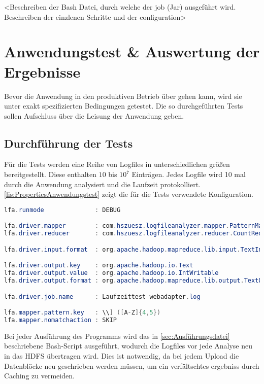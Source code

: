 <Beschreiben der Bash Datei, durch welche der job (Jar) ausgeführt wird. Beschreiben der einzlenen Schritte und der configuration>

\section{Anwendungstest \& Auswertung der Ergebnisse}
Bevor die Anwendung in den produktiven Betrieb über gehen kann, wird sie unter exakt spezifizierten Bedingungen getestet. Die so durchgeführten Tests sollen Aufschluss über die Leisung der Anwendung geben.

\subsection{Durchführung der Tests}
Für die Tests werden eine Reihe von Logfiles in unterschiedlichen größen bereitgestellt. Diese enthalten $10$ bis $10^7$ Einträgen. Jedes Logfile wird 10 mal durch die Anwendung analysiert und die Laufzeit protokolliert. \autoref{lis:PropertiesAnwendungstest} zeigt die für die Tests verwendete Konfiguration. \\

\begin{lstlisting}[language=Java,caption=Properties für Anwendungstest,label=lis:PropertiesAnwendungstest]
lfa.runmode              : DEBUG

lfa.driver.mapper        : com.hszuesz.logfileanalyzer.mapper.PatternMapper
lfa.driver.reducer       : com.hszuesz.logfileanalyzer.reducer.CountReducer

lfa.driver.input.format  : org.apache.hadoop.mapreduce.lib.input.TextInputFormat

lfa.driver.output.key    : org.apache.hadoop.io.Text
lfa.driver.output.value  : org.apache.hadoop.io.IntWritable
lfa.driver.output.format : org.apache.hadoop.mapreduce.lib.output.TextOutputFormat

lfa.driver.job.name      : Laufzeittest webadapter.log

lfa.mapper.pattern.key   : \\] ([A-Z]{4,5})
lfa.mapper.nomatchaction : SKIP
\end{lstlisting}

Bei jeder Ausführung des Programms wird das in \autoref{sec:Ausführungsdatei} beschriebene Bash-Script ausgeführt, wodurch die Logfiles vor jede Analyse neu in das \ac{HDFS} übertragen wird. Dies ist notwendig, da bei jedem Upload die Datenblöcke neu geschrieben werden müssen, um ein verfältschtes ergebniss durch Caching zu vermeiden.


